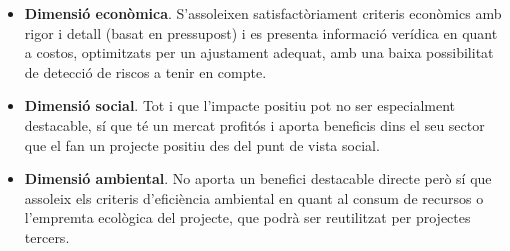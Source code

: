 \begin{itemize}
\item \textbf{Dimensió econòmica}. S’assoleixen satisfactòriament criteris econòmics amb rigor i detall (basat en pressupost) i es presenta informació verídica en quant a costos, optimitzats per un ajustament adequat, amb una baixa possibilitat de detecció de riscos a tenir en compte.
\item \textbf{Dimensió social}. Tot i que l’impacte positiu pot no ser especialment destacable, sí que té un mercat profitós i aporta beneficis dins el seu sector que el fan un projecte positiu des del punt de vista social.
\item \textbf{Dimensió ambiental}. No aporta un benefici destacable directe però sí que assoleix els criteris d’eficiència ambiental en quant al consum de recursos o l’empremta ecològica del projecte, que podrà ser reutilitzat per projectes tercers.
\end{itemize}